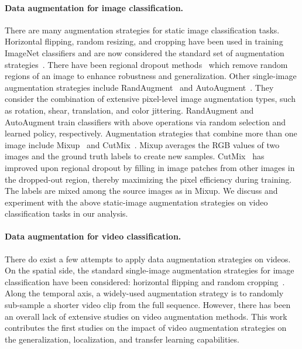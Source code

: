 \paragraph{Data augmentation for image classification.}
There are many augmentation strategies for static image classification tasks. 
Horizontal flipping, random resizing, and cropping have been used in training ImageNet classifiers and are now considered the standard set of augmentation strategies~\cite{Inceptionv3}.
There have been regional dropout methods~\cite{devries2017cutout,zhong2017randomerase} which remove random regions of an image to enhance robustness and generalization.
Other single-image augmentation strategies include RandAugment~\cite{randaugment} and AutoAugment~\cite{autoaugment}. They consider the combination of extensive pixel-level image augmentation types, such as rotation, shear, translation, and color jittering. RandAugment and AutoAugment train classifiers with above operations via random selection and learned policy, respectively.
Augmentation strategies that combine more than one image include Mixup~\cite{zhang2017mixup} and CutMix~\cite{cutmix}. Mixup averages the RGB values of two images and the ground truth labels to create new samples.
CutMix~\cite{cutmix} has improved upon regional dropout by filling in image patches from other images in the dropped-out region, thereby maximizing the pixel efficiency during training.
The labels are mixed among the source images as in Mixup. We discuss and experiment with the above static-image augmentation strategies on video classification tasks in our analysis.

\paragraph{Data augmentation for video classification.}
There do exist a few attempts to apply data augmentation strategies on videos. On the spatial side, the standard single-image augmentation strategies for image classification have been considered: horizontal flipping and random cropping~\cite{wang2015towards}. 
Along the temporal axis, a widely-used augmentation strategy is to randomly sub-sample a shorter video clip from the full sequence.
However, there has been an overall lack of extensive studies on video augmentation methods. This work contributes the first studies on the impact of video augmentation strategies on the generalization, localization, and transfer learning capabilities.